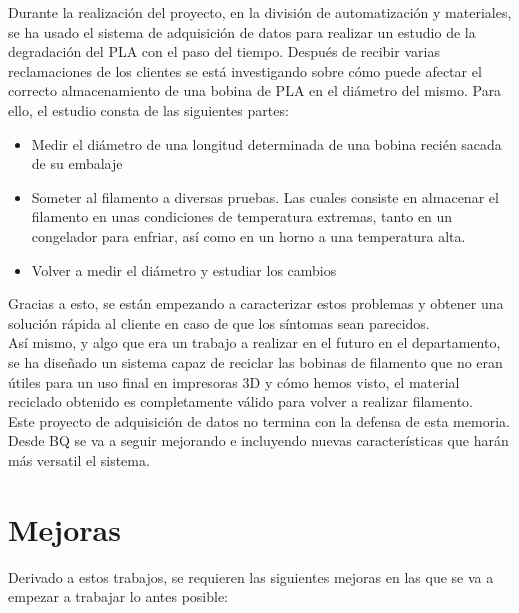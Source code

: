 Durante la realización del proyecto, en la división de automatización y materiales, se ha usado el sistema de adquisición de datos para realizar un estudio de la degradación del PLA con el paso del tiempo. Después de recibir varias reclamaciones de los clientes se está investigando sobre cómo puede afectar el correcto almacenamiento de una bobina de PLA en el diámetro del mismo. Para ello, el estudio consta de las siguientes partes:

\begin{itemize}
	\item{Medir el diámetro de una longitud determinada de una bobina recién sacada de su embalaje}
	\item{Someter al filamento a diversas pruebas. Las cuales consiste en almacenar el filamento en unas condiciones de temperatura extremas, tanto en un congelador para enfriar, así como en un horno a una temperatura alta.}
	\item{Volver a medir el diámetro y estudiar los cambios}
\end{itemize}

Gracias a esto, se están empezando a caracterizar estos problemas y obtener una solución rápida al cliente en caso de que los síntomas sean parecidos.\\

Así mismo, y algo que era un trabajo a realizar en el futuro en el departamento, se ha diseñado un sistema capaz de reciclar las bobinas de filamento que no eran útiles para un uso final en impresoras 3D y cómo hemos visto, el material reciclado obtenido es completamente válido para volver a realizar filamento.\\

Este proyecto de adquisición de datos no termina con la defensa de esta memoria. Desde BQ se va a seguir mejorando e incluyendo nuevas características que harán más versatil el sistema.

\section{Mejoras}
Derivado a estos trabajos, se requieren las siguientes mejoras en las que se va a empezar a trabajar lo antes posible:

